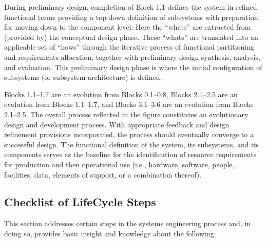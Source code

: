 During preliminary design, completion of Block 1.1 defines the system in refined functional terms providing a top-down definition of subsystems with preparation for moving down to the component level. Here the ``whats'' are extracted from (provided by) the conceptual design phase. These ``whats'' are translated into an applicable set of ``hows'' through the iterative process of functional partitioning and requirements allocation, together with preliminary design synthesis, analysis, and evaluation. This preliminary design phase is where the initial configuration of subsystems (or subsystem architecture) is defined.

Blocks 1.1–1.7 are an evolution from Blocks 0.1–0.8, Blocks 2.1–2.5 are an evolution from Blocks 1.1–1.7, and Blocks 3.1–3.6 are an evolution from Blocks 2.1–2.5. The overall process reflected in the figure constitutes an evolutionary design and development process. With appropriate feedback and design refinement provisions incorporated, the process should eventually converge to a successful design. The functional definition of the system, its subsystems, and its components serves as the baseline for the identification of resource requirements for production and then operational use (i.e., hardware, software, people, facilities, data, elements of support, or a combination thereof).

\subsection{Checklist of Life\-Cycle Steps}

This section addresses certain steps in the systems engineering process and, in doing so, provides basic insight and knowledge about the following:

